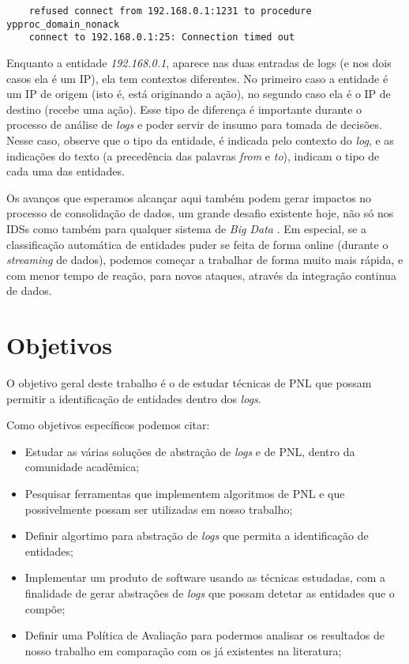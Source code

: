 \documentclass[
	12pt,				%
	openright,			%
	twoside,			%
	a4paper,			%
	english,			%
	spanish,			%
	brazil,				%
	]{abntex2}
\begin{document}
{\tiny
	\begin{verbatim}
	refused connect from 192.168.0.1:1231 to procedure ypproc_domain_nonack 
	connect to 192.168.0.1:25: Connection timed out
	\end{verbatim}
}

Enquanto a entidade \emph{192.168.0.1}, aparece nas duas entradas de logs (e nos dois casos ela é um IP), ela tem contextos diferentes. No primeiro caso a entidade é um IP de origem (isto é, está originando a ação), no segundo caso ela é o IP de destino (recebe uma ação). Esse tipo de diferença é importante durante o processo de análise de \emph{logs} e poder servir de insumo para tomada de decisões. Nesse caso, observe que o tipo da entidade, é indicada pelo contexto do \emph{log}, e as indicações do texto (a precedência das palavras \emph{from} e \emph{to}), indicam o tipo de cada uma das entidades.

Os avanços que esperamos alcançar aqui também podem gerar impactos no processo de consolidação de dados, um grande desafio existente hoje, não só nos IDSs como também para qualquer sistema de \emph{Big Data} \cite{zuech2015intrusion}. Em especial, se a classificação automática de entidades puder se feita de forma online (durante o  \emph{streaming} de dados), podemos começar a trabalhar de forma muito mais rápida, e com menor tempo de reação, para novos ataques, através da integração continua de dados.


\section{Objetivos}
O objetivo geral deste trabalho é o de estudar técnicas de PNL que possam permitir a identificação de entidades dentro dos \emph{logs}.

Como objetivos específicos podemos citar:
\begin{itemize}
	\item Estudar as várias soluções de abstração de \emph{logs} e de PNL, dentro da comunidade acadêmica;
	
	\item Pesquisar ferramentas que implementem algoritmos de PNL e que possivelmente possam ser utilizadas em nosso trabalho;
	
	\item Definir algortimo para abstração de \emph{logs} que permita a identificação de entidades;
	
	\item Implementar um produto de software usando as técnicas estudadas, com a finalidade de gerar abstrações de \emph{logs} que possam detetar as entidades que o compõe;
	
	\item Definir uma Política de Avaliação para podermos analisar os resultados de nosso trabalho em comparação com os já existentes na literatura;
	
\end{itemize}
\end{document}
